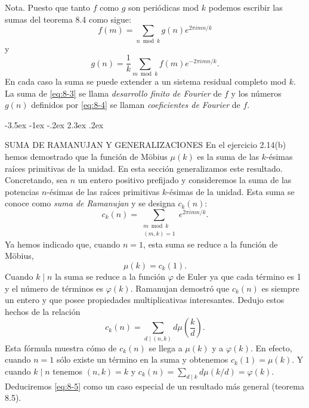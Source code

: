 \documentclass[12pt,a4paper]{book}
\makeatletter
\renewcommand\section{\@startsection{section}{1}{\z@}%
  {-3.5ex \@plus -1ex \@minus -.2ex}%
  {2.3ex \@plus .2ex}%
  {\normalfont\Large\bfseries\raggedright}}
\makeatother
\begin{document}
    Nota. Puesto que tanto $f$ como $g$ son periódicas mod $k$ podemos escribir las sumas
    del teorema 8.4 como sigue:
    \begin{equation}\label{eq:8-3}
        f(m)=\sum_{n\bmod k}g(n)e^{2\pi imn/k}
    \end{equation}
    y
    \begin{equation}\label{eq:8-4}
        g(n)=\frac{1}{k}\sum_{m\bmod k}f(m)e^{-2\pi imn/k}.
    \end{equation}
    En cada caso la suma se puede extender a un sistema residual completo mod $k$. La suma
    de \eqref{eq:8-3} se llama \textit{desarrollo finito de Fourier} de $f$ y los números
    $g(n)$ definidos por \eqref{eq:8-4} se llaman \textit{coeficientes de Fourier} de $f$.

    \section{SUMA DE RAMANUJAN Y GENERALIZACIONES}\label{sim:ck}
    En el ejercicio 2.14(b) hemos demostrado que la función de Möbius $\mu(k)$ es la suma
    de las $k$-ésimas raíces primitivas de la unidad. En esta sección generalizamos este
    resultado. Concretando, sea $n$ un entero positivo prefijado y consideremos la suma de
    las potencias $n$-ésimas de las raíces primitivas $k$-ésimas de la unidad. Esta suma se
    conoce como \textit{suma de Ramanujan} y se designa $c_{k}(n)$:
    \begin{equation*}
        c_{k}(n)=\sum_{\substack{m\bmod k\\(m,k)=1}}e^{2\pi imn/k}.
    \end{equation*}
    Ya hemos indicado que, cuando $n=1$, esta suma se reduce a la función de Möbius,
    \begin{equation*}
        \mu(k)=c_{k}(1).
    \end{equation*}
    Cuando $k\mid n$ la suma se reduce a la función $\varphi$ de Euler ya que cada término
    es 1 y el número de términos es $\varphi(k)$. Ramanujan demostró que $c_{k}(n)$ es siempre
    un entero y que posee propiedades multiplicativas interesantes. Dedujo estos hechos de
    la relación
    \begin{equation}\label{eq:8-5}
        c_{k}(n)=\sum_{d\mid(n,k)}d\mu\left(\frac{k}{d}\right).
    \end{equation}
    Esta fórmula muestra cómo de $c_{k}(n)$ se llega a $\mu(k)$ y a $\varphi(k)$. En efecto,
    cuando $n=1$ sólo existe un término en la suma y obtenemos $c_{k}(1)=\mu(k)$. Y cuando
    $k\mid n$ tenemos $(n,k)=k$ y $c_{k}(n)=\sum_{d\mid k}d\mu(k/d)=\varphi(k)$. Deduciremos
    \eqref{eq:8-5} como un caso especial de un resultado más general (teorema 8.5).
\end{document}
